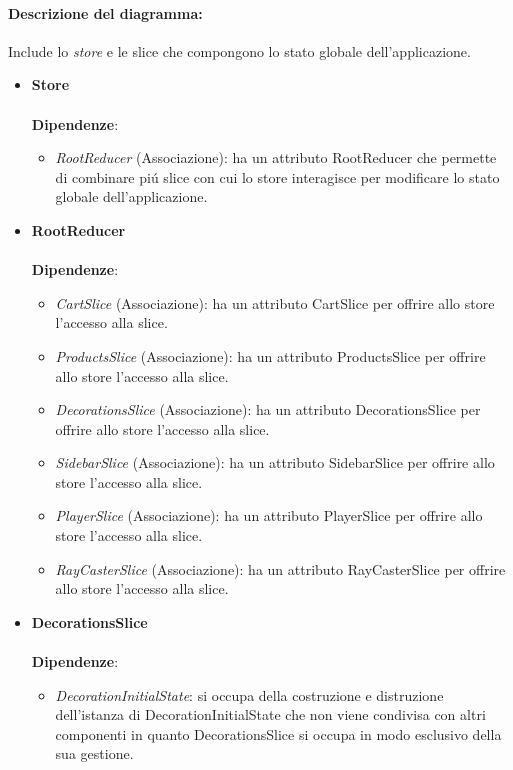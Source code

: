 \paragraph*{Descrizione del diagramma:}
Include lo \textit{store} e le slice che compongono lo stato globale dell'applicazione.
\begin{itemize}
		\item \textbf{Store}
		\\\\
		\textbf{Dipendenze}:
		\begin{itemize}
			\item \textit{RootReducer} (Associazione): ha un attributo RootReducer che permette di combinare piú slice con cui lo store interagisce 
			per modificare lo stato globale dell'applicazione.
		\end{itemize}
		\item \textbf{RootReducer}
		\\\\
		\textbf{Dipendenze}:
		\begin{itemize}
			\item \textit{CartSlice} (Associazione): ha un attributo CartSlice per offrire allo store l'accesso alla slice.
			\item \textit{ProductsSlice} (Associazione): ha un attributo ProductsSlice per offrire allo store l'accesso alla slice.
			\item \textit{DecorationsSlice} (Associazione): ha un attributo DecorationsSlice per offrire allo store l'accesso alla slice.
			\item \textit{SidebarSlice} (Associazione): ha un attributo SidebarSlice per offrire allo store l'accesso alla slice.
			\item \textit{PlayerSlice} (Associazione): ha un attributo PlayerSlice per offrire allo store l'accesso alla slice.
			\item \textit{RayCasterSlice} (Associazione): ha un attributo RayCasterSlice per offrire allo store l'accesso alla slice.
		\end{itemize}
		\item \textbf{DecorationsSlice}
		\\\\
		\textbf{Dipendenze}:
		\begin{itemize}
			\item \textit{DecorationInitialState}: si occupa della costruzione e distruzione dell'istanza di DecorationInitialState
			che non viene condivisa con altri componenti in quanto DecorationsSlice si occupa in modo esclusivo della sua gestione.
		\end{itemize}


\end{itemize}
